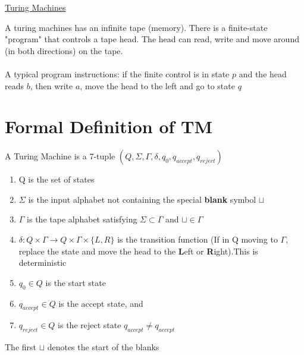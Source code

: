 \documentclass{article}[18pt]
\begin{document}
\begin{center}
\underline{\huge Turing Machines}
\end{center}
A turing machines has an infinite tape (memory). There is a finite-state "program" that controls a tape head. The head can read, write and move around (in both directions) on the tape.\\
\\
A typical program instructions: if the finite control is in state $p$ and the head reads $b$, then write $a$, move the head to the left and go to state $q$
\section{Formal Definition of TM}
A Turing Machine is a 7-tuple $(Q,\Sigma, \Gamma,\delta,q_0,q_{accept},q_{reject})$
\begin{enumerate}
	\item Q is the set of states
	\item $\Sigma$ is the input alphabet not containing the special \textbf{blank} symbol $\sqcup$
	\item $\Gamma$ is the tape alphabet satisfying $\Sigma \subset \Gamma$ and $\sqcup \in \Gamma$
	\item $\delta: Q\times \Gamma \rightarrow Q \times \Gamma \times \{L,R\}$ is the transition function (If in Q moving to $\Gamma$, replace the state and move the head to the \textbf{L}eft or \textbf{R}ight).This is deterministic
	\item $q_0\in Q$ is the start state
	\item $q_{accept} \in Q$ is the accept state, and
	\item $q_{reject}\in Q$ is the reject state $q_{accept}\neq q_{accept}$
\end{enumerate}
\begin{important}[Blanks]
The first $\sqcup$ denotes the start of the blanks
\end{important}
\end{document}
